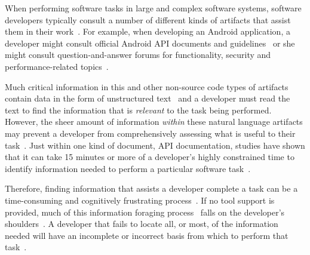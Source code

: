 

When performing software tasks in large and complex software systems, software developers typically consult a number of different kinds of artifacts that assist them in their work~\red{\cite{}}. For example, 
when developing an Android application, a developer might consult official Android API documents and guidelines~\red{\cite{}} or she might consult question-and-answer forums for functionality, security and performance-related topics~\cite{parnin2012}.




Much critical information in this and other non-source code types of artifacts 
contain data in the form of unstructured text~\cite{Bavota2016} and 
a developer must read the text to find the information that is \textit{relevant} to the task being performed.
However, the sheer amount of information \textit{within} these natural language artifacts may prevent a developer from comprehensively assessing what is useful to their task~\cite{Murphy2005}.  Just within one kind of document, API
documentation, studies have shown that it can take 15 minutes or more
of a developer's highly constrained time to identify 
information needed to perform a particular software task~\cite{endrikat2014, Meyer2017}.


Therefore, finding information that assists a developer complete a task can be a time-consuming
and cognitively frustrating process~\cite{Begel2008,
robillard2011field}.
If no tool support is provided, much of this information foraging process~\red{\cite{}} falls on the developer's shoulders~\red{\cite{}}. A developer that fails to locate all, or most, of the information needed
 will have an incomplete or incorrect basis from which to perform that task~\red{\cite{}}.









